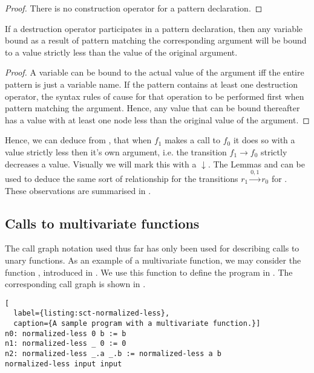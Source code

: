 \begin{proof} There is no construction operator for a pattern
declaration.\end{proof}

\begin{lemma}\label{lemma:d-pattern-less} If a destruction operator
participates in a pattern declaration, then any variable bound as a result of
pattern matching the corresponding argument will be bound to a value strictly
less than the value of the original argument.\end{lemma}

\begin{proof} A variable can be bound to the actual value of the argument iff
the entire pattern is just a variable name. If the pattern contains at least
one destruction operator, the syntax rules of \D{} cause for that operation to
be performed first when pattern matching the argument. Hence, any value that
can be bound thereafter has a value with at least one node less than the
original value of the argument. \end{proof}

Hence, we can deduce from , that when $f_1$ makes a
call to $f_0$ it does so with a value strictly less then it's own argument,
i.e. the transition $f_1\rightarrow f_0$ strictly decreases a value. Visually
we will mark this with a $\downarrow$. The Lemmas 
and  can be used to deduce the same sort of
relationship for the transitions $r_1\xrightarrow{0,1} r_0$ for
. These observations are summarised in
.



\subsection{Calls to multivariate functions}

The call graph notation used thus far has only been used for describing calls
to unary functions. As an example of a multivariate function, we may consider
the function , introduced in
. We use this function to define the program in
. The corresponding call graph is shown in
.

\begin{lstlisting}[
  label={listing:sct-normalized-less},
  caption={A sample program with a multivariate function.}]
n0: normalized-less 0 b := b
n1: normalized-less _ 0 := 0
n2: normalized-less _.a _.b := normalized-less a b
normalized-less input input
\end{lstlisting}

